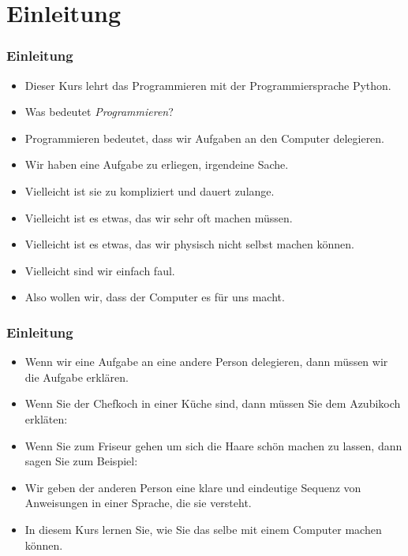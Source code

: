 \documentclass[aspectratio=169,mathserif,notheorems]{beamer}%
\subtitle{2.~Einleitung}%
\begin{document}
%
%
\startPresentation%
%
\section{Einleitung}%
%
\begin{frame}%
\frametitle{Einleitung}%
\begin{itemize}%
\item Dieser Kurs lehrt das Programmieren mit der Programmiersprache Python.%
\item<2-> Was bedeutet \emph{Programmieren}?%
\item<3-> Programmieren bedeutet, dass wir Aufgaben an den Computer delegieren.%
\item<4-> Wir haben eine Aufgabe zu erliegen, irgendeine Sache.%
\item<5-> Vielleicht ist sie zu kompliziert und dauert zulange.%
\item<6-> Vielleicht ist es etwas, das wir sehr oft machen müssen.%
\item<7-> Vielleicht ist es etwas, das wir physisch nicht selbst machen können.%
\item<8-> Vielleicht sind wir einfach faul.%
\item<9-> Also wollen wir, dass der Computer es für uns macht.%
\end{itemize}%
\end{frame}%
%
\begin{frame}%
\frametitle{Einleitung}%
\begin{itemize}%
\item Wenn wir eine Aufgabe an eine andere Person delegieren, dann müssen wir die Aufgabe erklären.%
\item<2-> Wenn Sie der Chefkoch in einer Küche sind, dann müssen Sie dem Azubikoch erkläten: %
\item<3-> Wenn Sie zum Friseur gehen um sich die Haare schön machen zu lassen, dann sagen Sie zum Beispiel:
\item<4-> Wir geben der anderen Person eine klare und eindeutige Sequenz von Anweisungen in einer Sprache, die sie versteht.%
\item<5-> In diesem Kurs lernen Sie, wie Sie das selbe mit einem Computer machen können.%
\end{itemize}%
\end{frame}%
%
%
\end{document}
